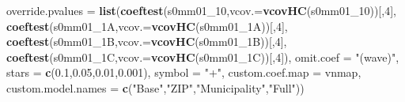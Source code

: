 \documentclass[
]{article}
\newenvironment{Shaded}{\begin{snugshade}}{\end{snugshade}}
\newcommand{\DataTypeTok}[1]{\textcolor[rgb]{0.13,0.29,0.53}{#1}}
\newcommand{\DecValTok}[1]{\textcolor[rgb]{0.00,0.00,0.81}{#1}}
\newcommand{\FloatTok}[1]{\textcolor[rgb]{0.00,0.00,0.81}{#1}}
\newcommand{\KeywordTok}[1]{\textcolor[rgb]{0.13,0.29,0.53}{\textbf{#1}}}
\newcommand{\NormalTok}[1]{#1}
\newcommand{\StringTok}[1]{\textcolor[rgb]{0.31,0.60,0.02}{#1}}
\begin{document}
\begin{Shaded}
\begin{Highlighting}[]
          \DataTypeTok{override.pvalues =} \KeywordTok{list}\NormalTok{(}\KeywordTok{coeftest}\NormalTok{(s0mm01_}\DecValTok{10}\NormalTok{,}\DataTypeTok{vcov.=}\KeywordTok{vcovHC}\NormalTok{(s0mm01_}\DecValTok{10}\NormalTok{))[,}\DecValTok{4}\NormalTok{],}
                                  \KeywordTok{coeftest}\NormalTok{(s0mm01_1A,}\DataTypeTok{vcov.=}\KeywordTok{vcovHC}\NormalTok{(s0mm01_1A))[,}\DecValTok{4}\NormalTok{],}
                                  \KeywordTok{coeftest}\NormalTok{(s0mm01_1B,}\DataTypeTok{vcov.=}\KeywordTok{vcovHC}\NormalTok{(s0mm01_1B))[,}\DecValTok{4}\NormalTok{],}
                                  \KeywordTok{coeftest}\NormalTok{(s0mm01_1C,}\DataTypeTok{vcov.=}\KeywordTok{vcovHC}\NormalTok{(s0mm01_1C))[,}\DecValTok{4}\NormalTok{]),}
          \DataTypeTok{omit.coef =} \StringTok{"(wave)"}\NormalTok{, }\DataTypeTok{stars =} \KeywordTok{c}\NormalTok{(}\FloatTok{0.1}\NormalTok{,}\FloatTok{0.05}\NormalTok{,}\FloatTok{0.01}\NormalTok{,}\FloatTok{0.001}\NormalTok{), }\DataTypeTok{symbol =} \StringTok{"+"}\NormalTok{,}
          \DataTypeTok{custom.coef.map =}\NormalTok{ vnmap, }
          \DataTypeTok{custom.model.names =} \KeywordTok{c}\NormalTok{(}\StringTok{"Base"}\NormalTok{,}\StringTok{"ZIP"}\NormalTok{,}\StringTok{"Municipality"}\NormalTok{,}\StringTok{"Full"}\NormalTok{))}
\end{Highlighting}
\end{Shaded}
\end{document}
